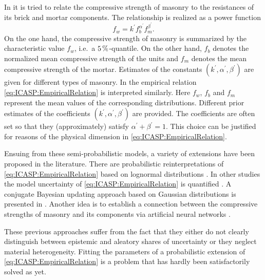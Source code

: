 In \cite{Standard:Eurocode6:1-1} it is tried to relate the compressive strength of masonry to the resistances of its brick and mortar components.
The relationship is realized as a power function
\begin{equation} \label{eq:ICASP:EmpiricalRelation}
  f_w = k^\prime f_b^{\alpha^\prime} f_m^{\beta^\prime}.
\end{equation} 
On the one hand, the compressive strength of masonry is summarized by the characteristic value \(f_w\), i.e.\ a \(\unit[5]{\%}\)-quantile.
On the other hand, \(f_b\) denotes the normalized mean compressive strength of the units and \(f_m\) denotes the mean compressive strength of the mortar. 
Estimates of the constants \((k^\prime,\alpha^\prime,\beta^\prime)\) are given for different types of masonry.
In \cite{Standard:JCSSProbabilisticCode} the empirical relation \cref{eq:ICASP:EmpiricalRelation} is interpreted similarly.
Here \(f_w\), \(f_b\) and \(f_m\) represent the mean values of the corresponding distributions.
Different prior estimates of the coefficients \((k^\prime,\alpha^\prime,\beta^\prime)\) are provided.
The coefficients are often set so that they (approximately) satisfy \(\alpha^\prime + \beta^\prime = 1\).
This choice can be justified for reasons of the physical dimension in \cref{eq:ICASP:EmpiricalRelation}.
\par %
Ensuing from these semi-probabilistic models, a variety of extensions have been proposed in the literature.
There are probabilistic reinterpretations of \cref{eq:ICASP:EmpiricalRelation} based on lognormal distributions \cite{Masonry:Schueremans2006,Masonry:Sykora2010,Masonry:Sykora2014:a,Masonry:Sykora2014:b}.
In other studies the model uncertainty of \cref{eq:ICASP:EmpiricalRelation} is quantified \cite{Masonry:Dymiotis2002,Masonry:Glowienka2006}.
A conjugate Bayesian updating approach based on Gaussian distributions is presented in \cite{Masonry:Mojsilovic2009}.
Another idea is to establish a connection between the compressive strengths of masonry and its components via artificial neural networks \cite{Masonry:GarzonRoca2013}.
\par %
These previous approaches suffer from the fact that they either do not clearly distinguish between epistemic and aleatory shares of uncertainty or they neglect material heterogeneity.
Fitting the parameters of a probabilistic extension of \cref{eq:ICASP:EmpiricalRelation} is a problem that has hardly been satisfactorily solved as yet.